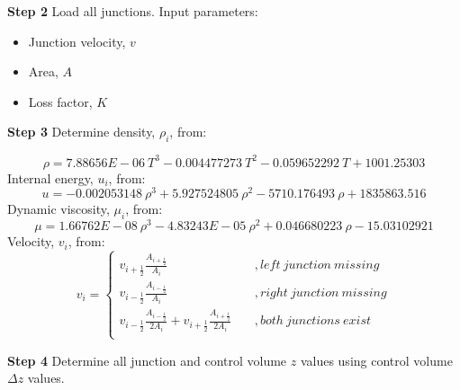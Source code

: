 \documentclass[11pt,letterpaper,titlepage]{article}
\newcommand{\half}{\frac{1}{2}}
\begin{document}
\vspace{0.5cm}\noindent
\textbf{Step 2}\newline
Load all junctions. Input parameters:
\begin{itemize}
\item Junction velocity, $v$
\item Area, $A$
\item Loss factor, $K$
\end{itemize}






\vspace{0.5cm}\noindent
\textbf{Step 3}\newline
\noindent Determine density, $\rho_i$, from:

\begin{equation*}
\rho=7.88656E-06 \ T^3-0.004477273 \ T^2-0.059652292 \ T+1001.25303
\end{equation*}
\newline
Internal energy, $u_i$, from:
\begin{equation*}
u=-0.002053148 \ \rho^3+5.927524805 \ \rho^2-5710.176493 \ \rho+1835863.516 
\end{equation*}
\newline
Dynamic viscosity, $\mu_i$, from:
\begin{equation*}
\mu=1.66762E-08 \ \rho^3-4.83243E-05 \ \rho^2+0.046680223 \ \rho-15.03102921
\end{equation*}
\newline
Velocity, $v_i$, from:
\begin{equation*}
v_i=
\begin{cases}
v_{i+\half} \frac{A_{i+\half}}{A_i} \quad &, left \ junction  \ missing \\
v_{i-\half} \frac{A_{i-\half}}{A_i} \quad &, right \ junction  \ missing \\
v_{i-\half} \frac{A_{i-\half}}{2A_i} + v_{i+\half} \frac{A_{i+\half}}{2A_i} \quad &, both \ junctions  \ exist \\
\end{cases}
\end{equation*}



\vspace{0.5cm}\noindent
\textbf{Step 4}\newline
Determine all junction and control volume $z$ values using control volume $\Delta z$ values.
\end{document}
